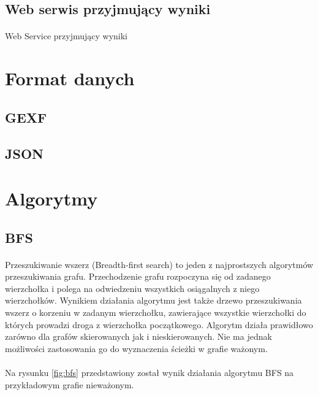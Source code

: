 \subsection{Web serwis przyjmujący wyniki}
\paragraph{}
Web Service przyjmujący wyniki 

\section{Format danych}
\label{sec:data}

\subsection{GEXF}

\subsection{JSON}

\section{Algorytmy}

\subsection{BFS}
\paragraph{}
Przeszukiwanie wszerz (Breadth-first search) to jeden z najprostszych algorytmów przeszukiwania grafu. 
Przechodzenie grafu rozpoczyna się od zadanego wierzchołka i polega na odwiedzeniu wszystkich osiągalnych z niego wierzchołków. 
Wynikiem działania algorytmu jest także drzewo przeszukiwania wszerz o korzeniu w zadanym wierzchołku, zawierające wszystkie wierzchołki do których
prowadzi droga z wierzchołka początkowego. 
Algorytm działa prawidłowo zarówno dla grafów skierowanych jak i nieskierowanych.
Nie ma jednak możliwości zastosowania go do wyznaczenia ścieżki w grafie ważonym.

\paragraph{}
Na rysunku \ref{fig:bfs} przedstawiony został wynik działania algorytmu BFS na przykładowym grafie nieważonym.

